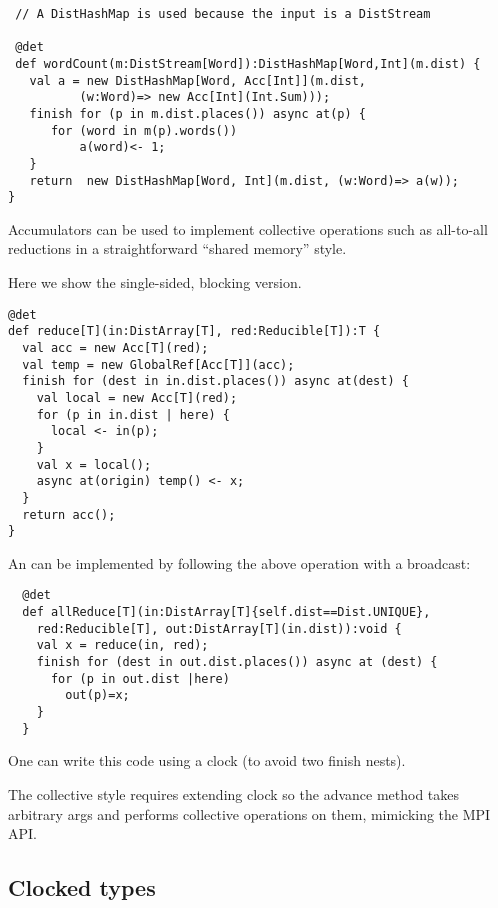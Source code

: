 \begin{example}
\begin{lstlisting}
 // A DistHashMap is used because the input is a DistStream

 @det 
 def wordCount(m:DistStream[Word]):DistHashMap[Word,Int](m.dist) {
   val a = new DistHashMap[Word, Acc[Int]](m.dist, 
          (w:Word)=> new Acc[Int](Int.Sum)));
   finish for (p in m.dist.places()) async at(p) {
      for (word in m(p).words())
          a(word)<- 1;
   }
   return  new DistHashMap[Word, Int](m.dist, (w:Word)=> a(w));
}
\end{lstlisting}
  
\end{example}


Accumulators can be used to implement collective operations such as
all-to-all reductions in a straightforward ``shared memory'' style.

Here we show the single-sided, blocking version.
\begin{example}
  \begin{lstlisting}
@det
def reduce[T](in:DistArray[T], red:Reducible[T]):T {
  val acc = new Acc[T](red);
  val temp = new GlobalRef[Acc[T]](acc);
  finish for (dest in in.dist.places()) async at(dest) {
    val local = new Acc[T](red);
    for (p in in.dist | here) {
      local <- in(p);
    }
    val x = local();
    async at(origin) temp() <- x;
  }
  return acc();
}    
\end{lstlisting}
\end{example}

An  can be implemented by following the above
operation with a broadcast:
\begin{lstlisting}
  @det
  def allReduce[T](in:DistArray[T]{self.dist==Dist.UNIQUE}, 
    red:Reducible[T], out:DistArray[T](in.dist)):void {
    val x = reduce(in, red);
    finish for (dest in out.dist.places()) async at (dest) {
      for (p in out.dist |here)
        out(p)=x;
    }      
  }
\end{lstlisting}
One can write this code using a clock (to avoid two finish nests).

The collective style requires extending clock so the advance method
takes arbitrary args and performs collective operations on them,
mimicking the MPI API.


\subsection{Clocked types}

